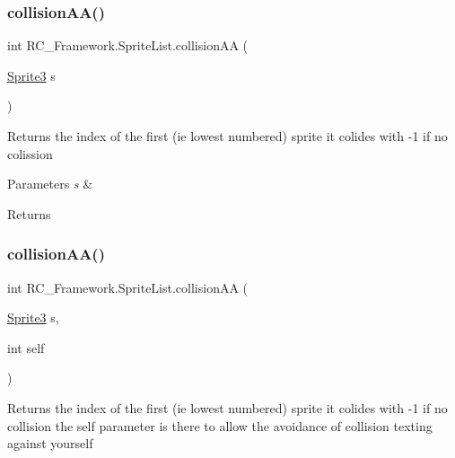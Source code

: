 \subsubsection{\texorpdfstring{collision\+A\+A()}{collisionAA()}\hspace{0.1cm}{\footnotesize\ttfamily [1/2]}}
{\footnotesize\ttfamily int R\+C\+\_\+\+Framework.\+Sprite\+List.\+collision\+AA (\begin{DoxyParamCaption}\item[{\mbox{\hyperlink{class_r_c___framework_1_1_sprite3}{Sprite3}}}]{s }\end{DoxyParamCaption})}



Returns the index of the first (ie lowest numbered) sprite it colides with -\/1 if no colission 


\begin{DoxyParams}{Parameters}
{\em s} & \\
\hline
\end{DoxyParams}
\begin{DoxyReturn}{Returns}

\end{DoxyReturn}
\mbox{\label{class_r_c___framework_1_1_sprite_list_aae4b98d6d9acdf7c2b2160eb6a4189d8}} 
\subsubsection{\texorpdfstring{collision\+A\+A()}{collisionAA()}\hspace{0.1cm}{\footnotesize\ttfamily [2/2]}}
{\footnotesize\ttfamily int R\+C\+\_\+\+Framework.\+Sprite\+List.\+collision\+AA (\begin{DoxyParamCaption}\item[{\mbox{\hyperlink{class_r_c___framework_1_1_sprite3}{Sprite3}}}]{s,  }\item[{int}]{self }\end{DoxyParamCaption})}



Returns the index of the first (ie lowest numbered) sprite it colides with -\/1 if no collision the self parameter is there to allow the avoidance of collision texting against yourself 


